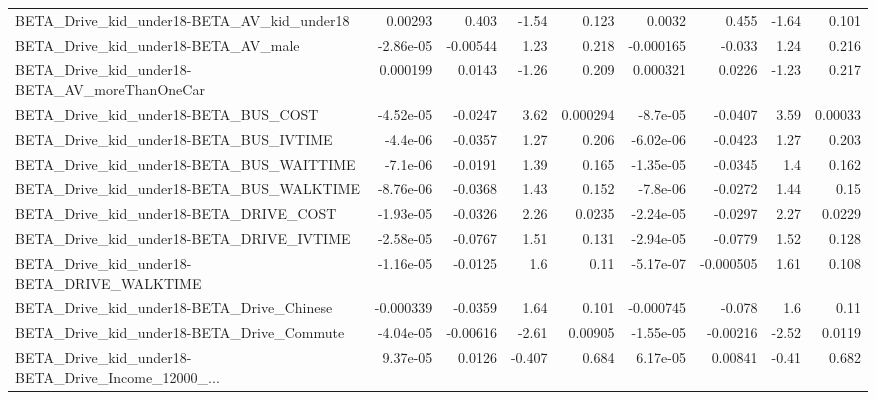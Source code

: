 \begin{tabular}{lrrrrrrrr}
BETA\_Drive\_kid\_under18-BETA\_AV\_kid\_under18         &     0.00293 &        0.403 &     -1.54 &    0.123 &     0.0032 &       0.455 &        -1.64 &         0.101 \\
BETA\_Drive\_kid\_under18-BETA\_AV\_male                &   -2.86e-05 &     -0.00544 &      1.23 &    0.218 &  -0.000165 &      -0.033 &         1.24 &         0.216 \\
BETA\_Drive\_kid\_under18-BETA\_AV\_moreThanOneCar      &    0.000199 &       0.0143 &     -1.26 &    0.209 &   0.000321 &      0.0226 &        -1.23 &         0.217 \\
BETA\_Drive\_kid\_under18-BETA\_BUS\_COST               &   -4.52e-05 &      -0.0247 &      3.62 & 0.000294 &   -8.7e-05 &     -0.0407 &         3.59 &       0.00033 \\
BETA\_Drive\_kid\_under18-BETA\_BUS\_IVTIME             &    -4.4e-06 &      -0.0357 &      1.27 &    0.206 &  -6.02e-06 &     -0.0423 &         1.27 &         0.203 \\
BETA\_Drive\_kid\_under18-BETA\_BUS\_WAITTIME           &    -7.1e-06 &      -0.0191 &      1.39 &    0.165 &  -1.35e-05 &     -0.0345 &          1.4 &         0.162 \\
BETA\_Drive\_kid\_under18-BETA\_BUS\_WALKTIME           &   -8.76e-06 &      -0.0368 &      1.43 &    0.152 &   -7.8e-06 &     -0.0272 &         1.44 &          0.15 \\
BETA\_Drive\_kid\_under18-BETA\_DRIVE\_COST             &   -1.93e-05 &      -0.0326 &      2.26 &   0.0235 &  -2.24e-05 &     -0.0297 &         2.27 &        0.0229 \\
BETA\_Drive\_kid\_under18-BETA\_DRIVE\_IVTIME           &   -2.58e-05 &      -0.0767 &      1.51 &    0.131 &  -2.94e-05 &     -0.0779 &         1.52 &         0.128 \\
BETA\_Drive\_kid\_under18-BETA\_DRIVE\_WALKTIME         &   -1.16e-05 &      -0.0125 &       1.6 &     0.11 &  -5.17e-07 &   -0.000505 &         1.61 &         0.108 \\
BETA\_Drive\_kid\_under18-BETA\_Drive\_Chinese          &   -0.000339 &      -0.0359 &      1.64 &    0.101 &  -0.000745 &      -0.078 &          1.6 &          0.11 \\
BETA\_Drive\_kid\_under18-BETA\_Drive\_Commute          &   -4.04e-05 &     -0.00616 &     -2.61 &  0.00905 &  -1.55e-05 &    -0.00216 &        -2.52 &        0.0119 \\
BETA\_Drive\_kid\_under18-BETA\_Drive\_Income\_12000\_... &    9.37e-05 &       0.0126 &    -0.407 &    0.684 &   6.17e-05 &     0.00841 &        -0.41 &         0.682 \\

\end{tabular}
